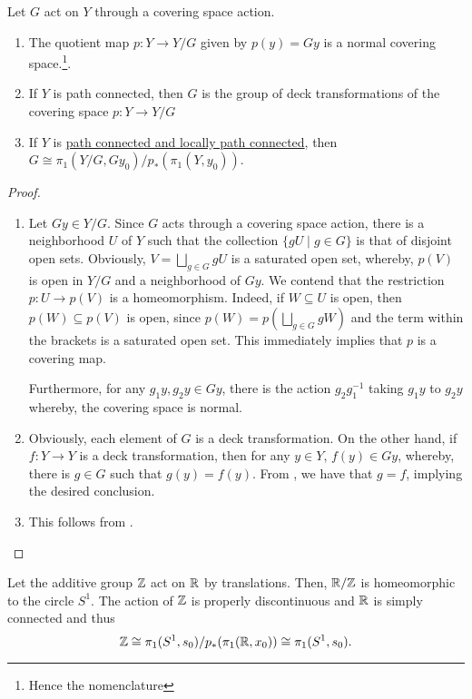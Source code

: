 \begin{theorem}
    Let $G$ act on $Y$ through a covering space action.
    \begin{enumerate}[label=(\alph*)]
        \item The quotient map $p: Y\to Y/G$ given by $p(y) = Gy$ is a normal covering space.\footnote{Hence the nomenclature}.
        \item If $Y$ is path connected, then $G$ is the group of deck transformations of the covering space $p: Y\to Y/G$ 
        \item If $Y$ is \ul{path connected and locally path connected}, then $G\cong\pi_1(Y/G, Gy_0)/p_*(\pi_1(Y, y_0))$.
    \end{enumerate}
\end{theorem}
\begin{proof}
\begin{enumerate}[label=(\alph*)]
    \item Let $Gy\in Y/G$. Since $G$ acts through a covering space action, there is a neighborhood $U$ of $Y$ such that the collection $\{gU\mid g\in G\}$ is that of disjoint open sets. Obviously, $V = \bigsqcup_{g\in G}gU$ is a saturated open set, whereby, $p(V)$ is open in $Y/G$ and a neighborhood of $Gy$. We contend that the restriction $p: U\to p(V)$ is a homeomorphism. Indeed, if $W\subseteq U$ is open, then $p(W)\subseteq p(V)$ is open, since $p(W) = p\left(\bigsqcup_{g\in G}gW\right)$ and the term within the brackets is a saturated open set. This immediately implies that $p$ is a covering map.

    Furthermore, for any $g_1y,g_2y\in Gy$, there is the action $g_2g_1^{-1}$ taking $g_1y$ to $g_2y$ whereby, the covering space is normal.

    \item Obviously, each element of $G$ is a deck transformation. On the other hand, if $f: Y\to Y$ is a deck transformation, then for any $y\in Y$, $f(y)\in Gy$, whereby, there is $g\in G$ such that $g(y) = f(y)$. From , we have that $g=f$, implying the desired conclusion. 
    
    \item This follows from .\qedhere
\end{enumerate}
\end{proof}

\begin{example}
    Let the additive group $\mathbb{Z}$ act on $\mathbb{R}$ by translations. Then, $\mathbb{R}/\mathbb{Z}$ is homeomorphic to the circle $S^1$. The action of $\mathbb{Z}$ is properly discontinuous and $\mathbb{R}$ is simply connected and thus 
    \begin{equation*}
        \mathbb{Z}\cong\pi_1(S^1, s_0)/p_\ast(\pi_1(\mathbb{R}, x_0))\cong\pi_1(S^1, s_0).
    \end{equation*}
\end{example}

